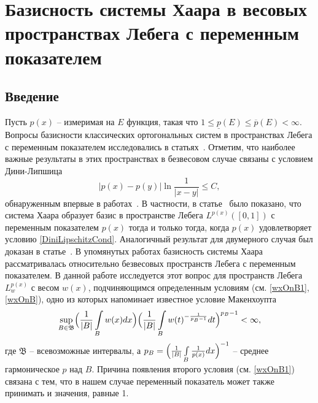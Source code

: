 \section{Базисность системы Хаара в весовых пространствах Лебега с переменным показателем}\label{section-haar-basis}

\subsection{Введение}
Пусть $p(x)$ -- измеримая на $E$ функция, такая что $1 \le \underline{p}(E) \le \overline{p}(E) < \infty$.
Вопросы базисности классических ортогональных систем в пространствах Лебега с переменным показателем исследовались в статьях~\cite{shii-haar-basis,shii-approx-lpx-2007,izuki-lpx,izuki-lpx-pre}. Отметим, что наиболее важные результаты в этих пространствах в безвесовом случае связаны с условием Дини-Липшица
\begin{equation}\label{DiniLipschitzCond}
 \bigl|p(x)-p(y)\bigr|\ln\frac{1}{|x-y|} \le C,
\end{equation}
обнаруженным впервые в работах~\cite{shii-haar-basis,shii-conv}. В частности, в статье~\cite{shii-haar-basis} было показано, что система Хаара образует базис в пространстве Лебега $L^{p(x)}([0,1])$ с переменным показателем $p(x)$ тогда и только тогда, когда $p(x)$ удовлетворяет условию \eqref{DiniLipschitzCond}. Аналогичный результат для двумерного случая был доказан в статье~\cite{mmg-haar2d}. В упомянутых работах базисность системы Хаара рассматривалась относительно безвесовых пространств Лебега с переменным показателем. В данной работе исследуется этот вопрос для пространств Лебега $L^{p(x)}_w$ с весом $w(x)$, подчиняющимся определенным условиям (см. \eqref{wxOnB1}, \eqref{wxOnB}), одно из которых напоминает известное условие Макенхоупта~\cite{diening-book-2011,diening-muckenhoupt,cruz-maxop}
\begin{equation}\label{MuckenhouptCond}
  \sup\limits_{B\in \mathfrak{B}}
  \Bigl(
  \frac{1}{|B|}
  \int\limits_{B}w(x)dx
  \Bigr)
  \Bigl(\frac{1}{|B|} \int\limits_{B}w(t)^{-\frac{1}{p_B-1}}dt\Bigr)^{p_B-1} < \infty,
\end{equation}
где $\mathfrak{B}$ -- всевозможные интервалы, а $p_B = \Bigl(\frac{1}{|B|}\int\limits_B \frac{1}{p(x)}dx\Bigr)^{-1}$ -- среднее гармоническое $p$ над $B$.
Причина появления второго условия (см. \eqref{wxOnB1}) связана с тем, что в нашем случае переменный показатель может также принимать и значения, равные 1.


